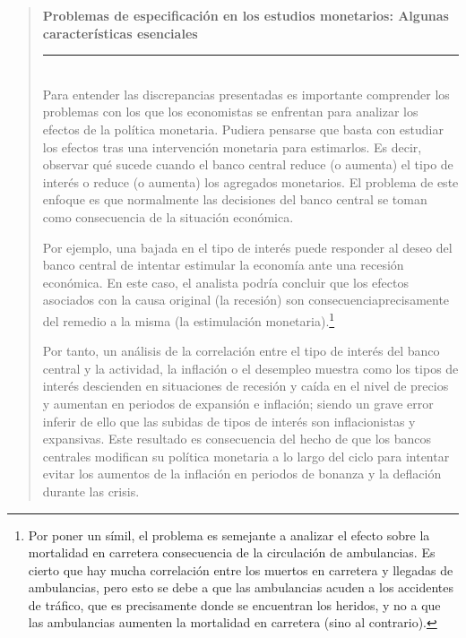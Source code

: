 \documentclass[10pt,a4paper]{article}
\newenvironment{specialblock}[1]{%
      \begin{quote} %
      \small %
      \noindent\textbf{#1}\\[-0.3em] %
      \rule{\linewidth}{0.4pt}\\[0.6em]}{
      \end{quote}}
\begin{document}
\begin{specialblock}{\textbf{Problemas de especificación en los estudios monetarios}: Algunas características esenciales}
    Para entender las discrepancias presentadas es importante comprender los problemas con los que los economistas se enfrentan para analizar los efectos de la política monetaria. Pudiera pensarse que basta con estudiar los efectos tras una intervención monetaria para estimarlos. Es decir, observar qué sucede cuando el banco central reduce (o aumenta) el tipo de interés o reduce (o aumenta) los agregados monetarios. El problema de este enfoque es que normalmente las decisiones del banco central se toman como consecuencia de la situación económica. 
    
    Por ejemplo, una bajada en el tipo de interés puede responder al deseo del banco central de intentar estimular la economía ante una recesión económica. En este caso, el analista podría concluir que los efectos asociados con la causa original (la recesión) son consecuenciaprecisamente del remedio a la misma (la estimulación monetaria).\footnote{%
        Por poner un símil, el problema es semejante a analizar el efecto sobre la mortalidad en carretera consecuencia de la circulación de ambulancias. Es cierto que hay mucha correlación entre los muertos en carretera y llegadas de ambulancias, pero esto se debe a que las ambulancias acuden a los accidentes de tráfico, que es precisamente donde se encuentran los heridos, y no a que las ambulancias aumenten la mortalidad en carretera (sino al contrario).
    } 
    
    Por tanto, un análisis de la correlación entre el tipo de interés del banco central y la actividad, la inflación o el desempleo muestra como los tipos de interés descienden en situaciones de recesión y caída en el nivel de precios y aumentan en periodos de expansión e inflación; siendo un grave error inferir de ello que las subidas de tipos de interés son inflacionistas y expansivas. Este resultado es consecuencia del hecho de que los bancos centrales modifican su política monetaria a lo largo del ciclo para intentar evitar los aumentos de la inflación en periodos de bonanza y la deflación durante las crisis. 


\end{specialblock}
\end{document}
